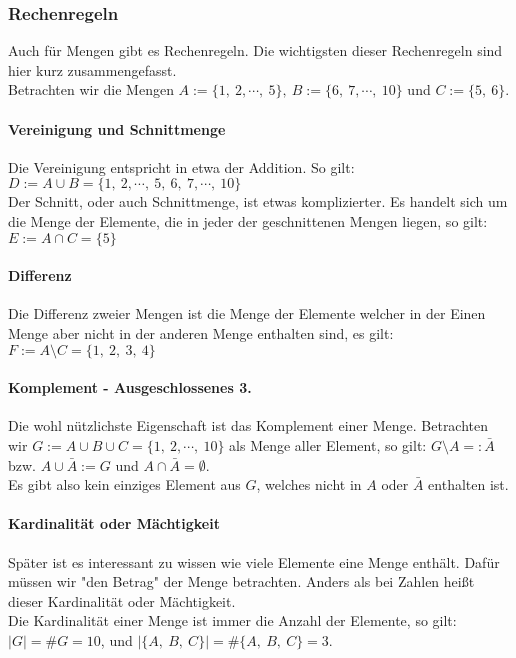 		\subsubsection{Rechenregeln}$ $\\
			Auch für Mengen gibt es Rechenregeln. Die wichtigsten dieser Rechenregeln
			sind hier kurz zusammengefasst.\\
			Betrachten wir die Mengen $A:=\{1,\ 2,\cdots,\ 5\},\ B:=\{6,\ 7,\cdots,\
			10\}$ und $C:=\{5,\ 6\}$.
			\paragraph{Vereinigung und Schnittmenge}$ $\\
				Die Vereinigung entspricht in etwa der Addition. So gilt: $D:=A\cup B=\{1,\
				2,\cdots,\ 5,\ 6,\ 7,\cdots,\ 10\}$\\
				Der Schnitt, oder auch Schnittmenge, ist etwas komplizierter. Es handelt
				sich um die Menge der Elemente, die in jeder der geschnittenen Mengen
				liegen, so gilt: $E:=A\cap C=\{5\}$\\
			\paragraph{Differenz}$ $\\
				Die Differenz zweier Mengen ist die Menge der Elemente welcher in der Einen
				Menge aber nicht in der anderen Menge enthalten sind, es gilt:
				$F:=A\setminus C=\{1,\ 2,\ 3,\ 4\}$\\
			\paragraph{Komplement - Ausgeschlossenes 3.}$ $\\
				Die wohl nützlichste Eigenschaft ist das Komplement einer Menge. Betrachten
				wir $G:=A\cup B\cup C=\{1,\ 2,\cdots,\ 10\}$ als Menge aller Element, so
				gilt:
				$G\setminus A=:\bar{A}$ bzw. $A\cup\bar{A}:=G$ und
				$A\cap\bar{A}=\emptyset$.\\
				Es gibt also kein einziges Element aus $G$, welches nicht in $A$ oder
				$\bar{A}$ enthalten ist.\\
			\paragraph{Kardinalität oder Mächtigkeit}$ $\\
				Später ist es interessant zu wissen wie viele Elemente eine Menge enthält.
				Dafür müssen wir "den Betrag"  der Menge betrachten. Anders als bei Zahlen
				heißt dieser Kardinalität oder Mächtigkeit.\\
				Die Kardinalität einer Menge ist immer die Anzahl der Elemente, so gilt:
				$\vert G\vert=\# G=10$, und $\vert\{A,\ B,\ C\}\vert=\# \{A,\ B,\ C\}=3$.\\
